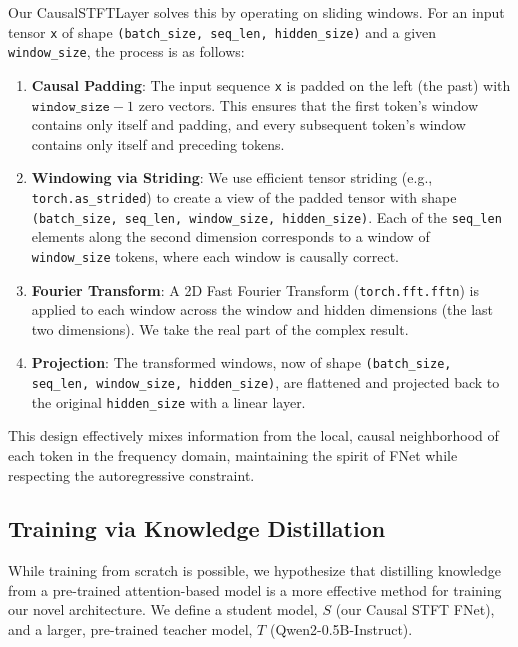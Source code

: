 \documentclass[11pt,a4paper]{article}
\begin{document}
Our CausalSTFTLayer solves this by operating on sliding windows. For an input tensor
\texttt{x} of shape \texttt{(batch\_size, seq\_len, hidden\_size)} and a given \texttt{window\_size}, the process is as follows:
\begin{enumerate}
\item \textbf{Causal Padding}: The input sequence \texttt{x} is padded on the left (the past) with $\texttt{window\_size} - 1$ zero vectors. This ensures that the first token's window contains only itself and padding, and every subsequent token's window contains only itself and preceding tokens.
\item \textbf{Windowing via Striding}: We use efficient tensor striding (e.g., \texttt{torch.as\_strided}) to create a view of the padded tensor with shape \texttt{(batch\_size, seq\_len, window\_size, hidden\_size)}. Each of the \texttt{seq\_len} elements along the second dimension corresponds to a window of \texttt{window\_size} tokens, where each window is causally correct.
\item \textbf{Fourier Transform}: A 2D Fast Fourier Transform (\texttt{torch.fft.fftn}) is applied to each window across the window and hidden dimensions (the last two dimensions). We take the real part of the complex result.
\item \textbf{Projection}: The transformed windows, now of shape \texttt{(batch\_size, seq\_len, window\_size, hidden\_size)}, are flattened and projected back to the original \texttt{hidden\_size} with a linear layer.
\end{enumerate}
This design effectively mixes information from the local, causal neighborhood of each token in the frequency domain, maintaining the spirit of FNet while respecting the autoregressive constraint.
\subsection{Training via Knowledge Distillation}
While training from scratch is possible, we hypothesize that distilling knowledge from a pre-trained attention-based model is a more effective method for training our novel architecture. We define a student model,
$S$ (our Causal STFT FNet), and a larger, pre-trained teacher model,
$T$ (Qwen2-0.5B-Instruct).
\end{document}
